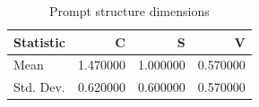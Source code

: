\begin{table}
\caption{Prompt structure dimensions}
\label{tab:prompt-structure}
\begin{tabular}{lrrr}
\toprule
Statistic & C & S & V \\
\midrule
Mean & 1.470000 & 1.000000 & 0.570000 \\
Std. Dev. & 0.620000 & 0.600000 & 0.570000 \\
\bottomrule
\end{tabular}
\end{table}
